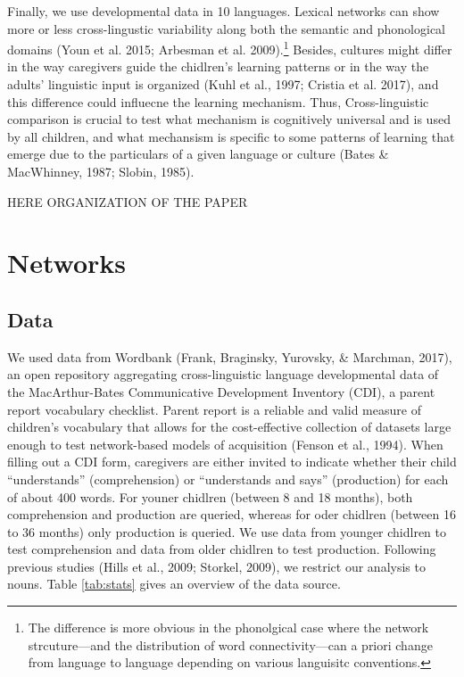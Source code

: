 \documentclass[english,floatsintext,man]{apa6}
\theoremstyle{definition}
\theoremstyle{definition}
\theoremstyle{definition}
\theoremstyle{remark}
\begin{document}
Finally, we use developmental data in 10 languages. Lexical networks can
show more or less cross-lingustic variability along both the semantic
and phonological domains (Youn et al. 2015; Arbesman et al.
2009).\footnote{The difference is more obvious in the phonolgical case where the network strcuture––and the distribution of word connectivity––can a priori change from language to language depending on various languisitc conventions.}
Besides, cultures might differ in the way caregivers guide the
chidlren's learning patterns or in the way the adults' linguistic input
is organized (Kuhl et al., 1997; Cristia et al. 2017), and this
difference could influecne the learning mechanism. Thus,
Cross-linguistic comparison is crucial to test what mechanism is
cognitively universal and is used by all children, and what mechansism
is specific to some patterns of learning that emerge due to the
particulars of a given language or culture (Bates \& MacWhinney, 1987;
Slobin, 1985).

HERE ORGANIZATION OF THE PAPER

\section{Networks}\label{networks}

\subsection{Data}\label{data}

We used data from Wordbank (Frank, Braginsky, Yurovsky, \& Marchman,
2017), an open repository aggregating cross-linguistic language
developmental data of the MacArthur-Bates Communicative Development
Inventory (CDI), a parent report vocabulary checklist. Parent report is
a reliable and valid measure of children's vocabulary that allows for
the cost-effective collection of datasets large enough to test
network-based models of acquisition (Fenson et al., 1994). When filling
out a CDI form, caregivers are either invited to indicate whether their
child \enquote{understands} (comprehension) or \enquote{understands and
says} (production) for each of about 400 words. For youner chidlren
(between 8 and 18 months), both comprehension and production are
queried, whereas for oder chidlren (between 16 to 36 months) only
production is queried. We use data from younger chidlren to test
comprehension and data from older chidlren to test production. Following
previous studies (Hills et al., 2009; Storkel, 2009), we restrict our
analysis to nouns. Table \ref{tab:stats} gives an overview of the data
source.
\end{document}
